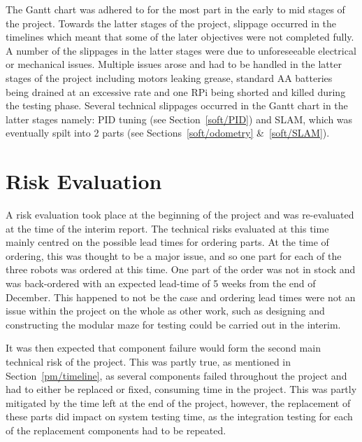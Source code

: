 The Gantt chart was adhered to for the most part in the early to
mid stages of the project. Towards the latter stages of the
project, slippage occurred in the timelines which meant that some
of the later objectives were not completed fully. A number
of the slippages in the latter stages were due to unforeseeable
electrical or mechanical issues. Multiple issues arose and had to
be handled in the latter stages of the project including motors
leaking grease, standard AA batteries being drained at an
excessive rate and one RPi being shorted and killed
during the testing phase. Several technical slippages occurred in the Gantt
chart in the latter stages namely: PID tuning (see Section~\ref{soft/PID}) and SLAM, which was eventually spilt into 2 parts (see Sections~\ref{soft/odometry} \&~\ref{soft/SLAM}).

\section{Risk Evaluation}\label{pm/riskeval}
A risk evaluation took place at the beginning of the project and
was re-evaluated at the time of the interim report. The technical
risks evaluated at this time mainly centred on the possible lead
times for ordering parts. At the time of ordering, this was
thought to be a major issue, and so one part for each of the three
robots was ordered at this time. One part of the order
was not in stock and was back-ordered with an expected
lead-time of 5 weeks from the end of December. This happened to
not be the case and ordering lead times were not an issue within
the project on the whole as other work, such as designing and
constructing the modular maze for testing could be carried out in
the interim.

It was then expected that component failure would form the second
main technical risk of the project. This was partly true, as
mentioned in Section~\ref{pm/timeline}, as several components
failed throughout the project and had to either be replaced or
fixed, consuming time in the project. This was partly mitigated by
the time left at the end of the project, however, the replacement
of these parts did impact on system testing time, as the
integration testing for each of the replacement components had to
be repeated.

